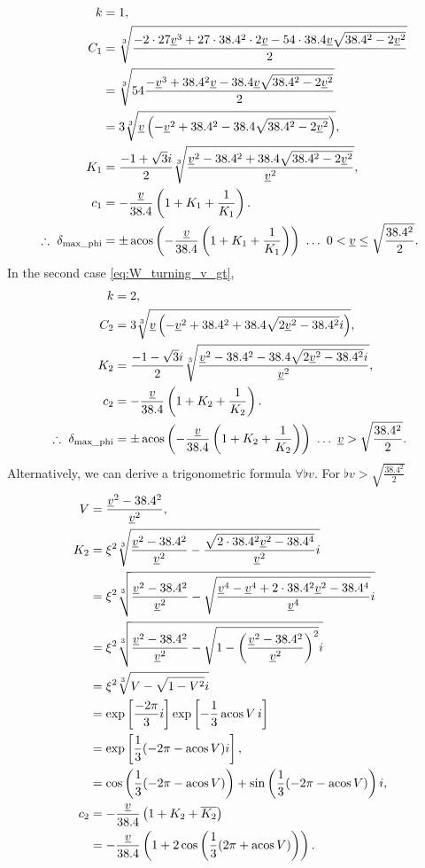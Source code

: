 \begin{align*}
k &= 1,\\
C_1 &= \sqrt[3]{\frac{-2\cdot 27\flat{v}^3 + 27\cdot 38.4^2\cdot 2\flat{v} - 54\cdot 38.4\flat{v} \sqrt{38.4^2 - 2\flat{v}^2}}{2}}\\
&= \sqrt[3]{54\frac{-\flat{v}^3 + 38.4^2 \flat{v} - 38.4\flat{v} \sqrt{38.4^2 - 2\flat{v}^2}}{2}}\\
&= 3\sqrt[3]{\flat{v} \left(-\flat{v}^2 + 38.4^2 - 38.4\sqrt{38.4^2 - 2\flat{v}^2} \right)},\\
K_1 &= \frac{-1 + \sqrt{3}i}{2} \sqrt[3]{\frac{\flat{v}^2 - 38.4^2 + 38.4\sqrt{38.4^2 - 2\flat{v}^2}}{\flat{v}^2}},\\
c_1 &= -\frac{\flat{v}}{38.4} \left(1 + K_1 + \frac{1}{K_1} \right).\\
\therefore\ \delta_{\maxphi} &= \pm \acos\left(-\frac{\flat{v}}{38.4} \left(1 + K_1 + \frac{1}{K_1} \right) \right)\ \ldots\ 0 < \flat{v} \le \sqrt{\frac{38.4^2}{2}}.
\end{align*}
In the second case \eqref{eq:W_turning_v_gt},
\begin{align*}
k &= 2,\\
C_2 &= 3\sqrt[3]{\flat{v} \left(-\flat{v}^2 + 38.4^2 + 38.4\sqrt{2\flat{v}^2 - 38.4^2}i \right)},\\
K_2 &= \frac{-1 - \sqrt{3}i}{2} \sqrt[3]{\frac{\flat{v}^2 - 38.4^2 - 38.4\sqrt{2\flat{v}^2 - 38.4^2}i}{\flat{v}^2}},\\
c_2 &= -\frac{\flat{v}}{38.4} \left(1 + K_2 + \frac{1}{K_2} \right).\\
\therefore\ \delta_{\maxphi} &= \pm \acos\left(-\frac{\flat{v}}{38.4} \left(1 + K_2 + \frac{1}{K_2} \right) \right)\ \ldots\ \flat{v} > \sqrt{\frac{38.4^2}{2}}.
\end{align*}
Alternatively, we can derive a trigonometric formula $\forall \flat{v}$.
For $\flat{v} > \sqrt{\frac{38.4^2}{2}}$
\begin{align*}
V &= \frac{\flat{v}^2 - 38.4^2}{\flat{v}^2},\\
K_2 &= \xi^2 \sqrt[3]{\frac{\flat{v}^2 - 38.4^2}{\flat{v}^2} - \frac{\sqrt{2\cdot 38.4^2\flat{v}^2 - 38.4^4}}{\flat{v}^2} i}\\
&= \xi^2 \sqrt[3]{\frac{\flat{v}^2 - 38.4^2}{\flat{v}^2} - \sqrt{\frac{\flat{v}^4 - \flat{v}^4 + 2\cdot 38.4^2\flat{v}^2 - 38.4^4}{\flat{v}^4}} i}\\
&= \xi^2 \sqrt[3]{\frac{\flat{v}^2 - 38.4^2}{\flat{v}^2} - \sqrt{1 - \left(\frac{\flat{v}^2 - 38.4^2}{\flat{v}^2} \right)^2} i}\\
&= \xi^2 \sqrt[3]{V - \sqrt{1 - V^2} i}\\
&= \exp\left[\frac{-2\pi}{3} i \right] \exp\left[-\frac{1}{3} \acos V\, i \right]\\
&= \exp\left[\frac{1}{3} (-2\pi - \acos V) i \right],\\
&= \cos\left(\frac{1}{3} (-2\pi - \acos V) \right) + \sin\left(\frac{1}{3} (-2\pi - \acos V) \right) i,\\
c_2 &= -\frac{\flat{v}}{38.4} \left(1 + K_2 + \conj{K_2} \right)\\
&= -\frac{\flat{v}}{38.4} \left(1 + 2\cos\left(\frac{1}{3} (2\pi + \acos V) \right) \right).
\end{align*}
